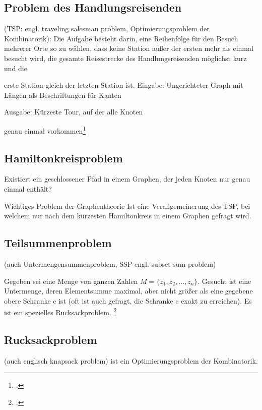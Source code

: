 \documentclass{lehramt-informatik-haupt}
\begin{document}
\subsection{Problem des Handlungsreisenden}

(TSP: engl. traveling salesman problem, Optimierungsproblem der
Kombinatorik): Die Aufgabe besteht darin, eine Reihenfolge für den
Besuch mehrerer Orte so zu wählen, dass keine Station außer der ersten
mehr als einmal besucht wird, die gesamte Reisestrecke des
Handlungsreisenden möglichst kurz und die

erste Station gleich der letzten Station ist. Eingabe: Ungerichteter
Graph mit Längen als Beschriftungen für Kanten

Ausgabe: Kürzeste Tour, auf der alle Knoten

genau einmal vorkommen\footcite[Seite 73]{theo:fs:4}

%

\subsection{Hamiltonkreisproblem}

Existiert ein geschlossener Pfad in einem
Graphen, der jeden Knoten nur genau einmal enthält?

Wichtiges Problem der Graphentheorie
Ist eine Verallgemeinerung des TSP, bei welchem nur nach dem kürzesten
Hamiltonkreis in einem Graphen gefragt wird.

%

\subsection{Teilsummenproblem}

(auch Untermengensummenproblem, SSP engl. subset sum problem)

Gegeben sei eine Menge von ganzen Zahlen $M = \{z_1 , z_2 , \dots, z_n
\}$. Gesucht ist eine Untermenge, deren Elementsumme maximal, aber nicht
größer als eine gegebene obere Schranke c ist (oft ist auch gefragt, die
Schranke c exakt zu erreichen). Es ist ein spezielles Rucksackproblem.
\footcite[Seite 74]{theo:fs:4}

%

\subsection{Rucksackproblem}

(auch englisch knapsack problem) ist ein Optimierungsproblem der
Kombinatorik.
\end{document}
